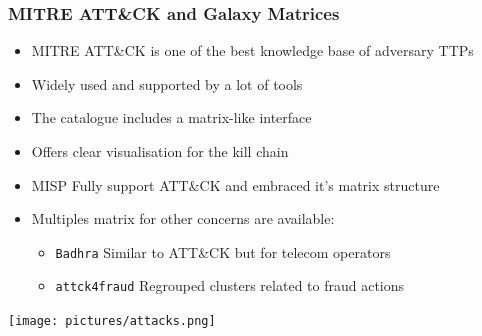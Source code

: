 \begin{frame}
    \frametitle{MITRE ATT\&CK and Galaxy Matrices}
    \begin{itemize}
        \item MITRE ATT\&CK is one of the best knowledge base of adversary TTPs
        \item Widely used and supported by a lot of tools
        \item The catalogue includes a matrix-like interface
        \item Offers clear visualisation for the kill chain
    \end{itemize}
    \begin{itemize}
        \item MISP Fully support ATT\&CK and embraced it's matrix structure
        \item Multiples matrix for other concerns are available:
        \begin{itemize}
            \item \texttt{Badhra} Similar to ATT&CK but for telecom operators
            \item \texttt{attck4fraud} Regrouped clusters related to fraud actions
        \end{itemize}
    \end{itemize}
    \texttt{[image: pictures/attacks.png]}
\end{frame}

